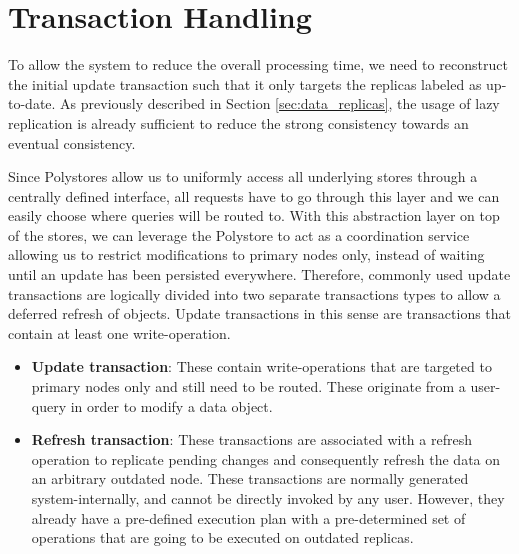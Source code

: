 
\section{Transaction Handling}
\label{sec:tx_handling}

To allow the system to reduce the overall processing time, we need to reconstruct the initial update transaction such that it only 
targets the replicas labeled as up-to-date. As previously described in Section \ref{sec:data_replicas}, the usage of lazy replication is already sufficient to reduce the strong
consistency towards an eventual consistency.

Since Polystores allow us to uniformly access all underlying stores through a centrally defined interface, 
all requests have to go through this layer and we can easily choose where queries will be routed to. 
With this abstraction layer on top of the stores, we can leverage the Polystore to act as a coordination service allowing us to restrict modifications to primary nodes only, 
instead of waiting until an update has been persisted everywhere.
Therefore, commonly used update transactions are logically divided into two separate transactions types to allow a deferred refresh of objects.
Update transactions in this sense are transactions that contain at least one write-operation.
\begin{itemize}
    \item \textbf{Update transaction}:  These contain write-operations that are targeted to primary nodes only and still need to be routed. 
                                        These originate from a user-query in order to modify a data object.

    \item \textbf{Refresh transaction}: These transactions are associated with a refresh operation to replicate pending changes and consequently refresh the data on an arbitrary outdated node.
                                        These transactions are normally generated system-internally, and cannot be directly invoked by any user. 
                                        However, they already have a pre-defined execution plan with a pre-determined set of operations that are going to be executed on outdated replicas.               
\end{itemize}


